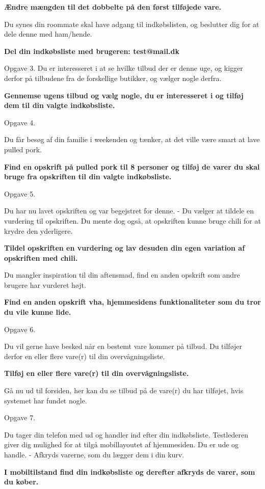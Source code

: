 \textbf{Ændre mængden til det dobbelte på den først tilføjede vare.}

Du synes din roommate skal have adgang til indkøbslisten, og beslutter dig for at dele denne med ham/hende.

\textbf{Del din indkøbsliste med brugeren: test@mail.dk}

Opgave 3.
Du er interesseret i at se hvilke tilbud der er denne uge, og kigger derfor på tilbudene fra de forskellige butikker, og vælger nogle derfra.

\textbf{Gennemse ugens tilbud og vælg nogle, du er interesseret i og tilføj dem til din valgte indkøbsliste.}

Opgave 4.

Du får besøg af din familie i weekenden og tænker, at det ville være smart at lave pulled pork.

\textbf{Find en opskrift på pulled pork til 8 personer og tilføj de varer du skal bruge fra opskriften til din valgte indkøbsliste.}

Opgave 5.

Du har nu lavet opskriften og var begejstret for denne. 
- Du vælger at tildele en vurdering til opskriften.
Du mente dog også, at opskriften kunne bruge chili for at krydre den yderligere.

\textbf{Tildel opskriften en vurdering og lav desuden din egen variation af opskriften med chili.}

Du mangler inspiration til din aftensmad, find en anden opskrift som andre brugere har vurderet højt.

\textbf{Find en anden opskrift vha, hjemmesidens funktionaliteter som du tror du vile kunne lide.}

Opgave 6.

Du vil gerne have besked når en bestemt vare kommer på tilbud. 
Du tilføjer derfor en eller flere vare(r) til din overvågningsliste.

\textbf{Tilføj en eller flere vare(r) til din overvågningsliste.}

Gå nu ud til forsiden, her kan du se tilbud på de vare(r) du har tilføjet, hvis systemet har fundet nogle.

Opgave 7.

Du tager din telefon med ud og handler ind efter din indkøbsliste. 
Testlederen giver dig mulighed for at tilgå mobillayoutet af hjemmesiden. 
Du er ude og handle. 
- Afkryds varerne, som du lægger dem i din kurv.


\textbf{I mobiltilstand find din indkøbsliste og derefter afkryds de varer, som du køber.}

